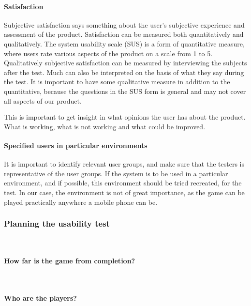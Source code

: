 \paragraph{Satisfaction}

Subjective satisfaction says something about the user's subjective experience and assessment of the product. Satisfaction can be measured both quantitatively and qualitatively. The system usability scale (SUS) is a form of quantitative measure, where users rate various aspects of the product on a scale from 1 to 5. Qualitatively subjective satisfaction can be measured by interviewing the subjects after the test. Much can also be interpreted on the basis of what they say during the test. It is important to have some qualitative measure in addition to the quantitative, because the questions in the SUS form is general and may not cover all aspects of our product.

This is important to get insight in what opinions the user has about the product. What is working, what is not working and what could be improved.

\paragraph{Specified users in particular environments}

It is important to identify relevant user groups, and make sure that the testers is representative of the user groups. If the system is to be used in a particular environment, and if possible, this environment should be tried recreated, for the test. In our case, the environment is not of great importance, as the game can be played practically anywhere a mobile phone can be.

\subsubsection{Planning the usability test}\mbox{}\\

\paragraph{How far is the game from completion?}\mbox{}\\



\paragraph{Who are the players?}\mbox{}\\

